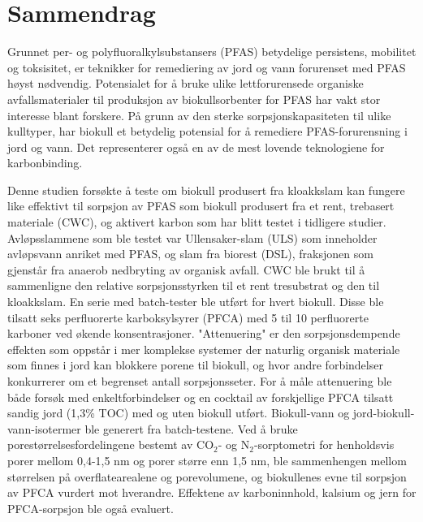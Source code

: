 \newpage
{}
\section*{Sammendrag}
Grunnet per- og polyfluoralkylsubstansers (PFAS) betydelige persistens, mobilitet og toksisitet, er teknikker for remediering av jord og vann forurenset med PFAS høyst nødvendig. Potensialet for å bruke ulike lettforurensede organiske avfallsmaterialer til produksjon av biokullsorbenter for PFAS har vakt stor interesse blant forskere. På grunn av den sterke sorpsjonskapasiteten til ulike kulltyper, har biokull et betydelig potensial for å remediere PFAS-forurensning i jord og vann. Det representerer også en av de mest lovende teknologiene for karbonbinding.

Denne studien forsøkte å teste om biokull produsert fra kloakkslam kan fungere like effektivt til sorpsjon av PFAS som biokull produsert fra et rent, trebasert materiale (CWC), og aktivert karbon som har blitt testet i tidligere studier. Avløpsslammene som ble testet var Ullensaker-slam (ULS) som inneholder avløpsvann anriket med PFAS, og slam fra biorest (DSL), fraksjonen som gjenstår fra anaerob nedbryting av organisk avfall. CWC ble brukt til å sammenligne den relative sorpsjonsstyrken til et rent tresubstrat og den til kloakkslam. En serie med batch-tester ble utført for hvert biokull. Disse ble tilsatt seks perfluorerte karboksylsyrer (PFCA) med 5 til 10 perfluorerte karboner ved økende konsentrasjoner. "Attenuering" er den sorpsjonsdempende effekten som oppstår i mer komplekse systemer der naturlig organisk materiale som finnes i jord kan blokkere porene til biokull, og hvor andre forbindelser konkurrerer om et begrenset antall sorpsjonsseter. For å måle attenuering ble både forsøk med enkeltforbindelser og en cocktail av forskjellige PFCA tilsatt sandig jord (1,3\% TOC) med og uten biokull utført. Biokull-vann og jord-biokull-vann-isotermer ble generert fra batch-testene. Ved å bruke porestørrelsesfordelingene bestemt av $\mathrm{CO_2}$- og $\mathrm{N_2}$-sorptometri for henholdsvis porer mellom 0,4-1,5 nm og porer større enn 1,5 nm, ble sammenhengen mellom størrelsen på overflatearealene og porevolumene, og biokullenes evne til sorpsjon av PFCA vurdert mot hverandre. Effektene av karboninnhold, kalsium og jern for PFCA-sorpsjon ble også evaluert.

